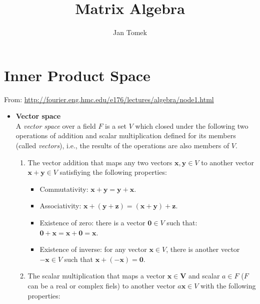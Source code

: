 \documentclass[10pt,b5paper,titlepage]{book}
\author{Jan Tomek}
\title{\bf Matrix Algebra}
\begin{document}
\maketitle

\tableofcontents

\chapter{Inner Product Space}

From: \url{http://fourier.eng.hmc.edu/e176/lectures/algebra/node1.html}\\

\begin{itemize}
    \item \textbf{Vector space}\\

        A \textit{vector space} over a field $F$ is a set $V$ which closed under
        the following two operations of addition and scalar multiplication
        defined for its members (called \textit{vectors}), i.e., the results
        of the operations are also members of $V$.

        \begin{enumerate}
            \item The vector addition that maps any two vectors
                $\mathbf{x}, \mathbf{y} \in V$ to another vector
                $\mathbf{x} + \mathbf{y} \in V$ satisfiying the following
                properties:
                \begin{itemize}
                    \item Commutativity: $\mathbf{x} + \mathbf{y} = \mathbf{y} + \mathbf{x}$.
                    \item Associativity: $\mathbf{x} + (\mathbf{y} + \mathbf{z}) = (\mathbf{x} + \mathbf{y}) + \mathbf{z}$.
                    \item Existence of zero: there is a vector $\mathbf{0} \in V$ such that: $\mathbf{0} + \mathbf{x} = \mathbf{x} + \mathbf{0} = \mathbf{x}$.
                    \item Existence of inverse: for any vector $\mathbf{x} \in V$,
                        there is another vector $-\mathbf{x} \in V$ such that $\mathbf{x} + (- \mathbf{x}) = \mathbf{0}$.
                \end{itemize}
            \item The scalar multiplication that maps a vector $\mathbf{x \in V}$
                and scalar $a \in F$ ($F$ can be a real or complex fiels) to another
                vector $a \mathbf{x} \in V$ with the following properties:


\end{enumerate}
\end{itemize}
\end{document}
